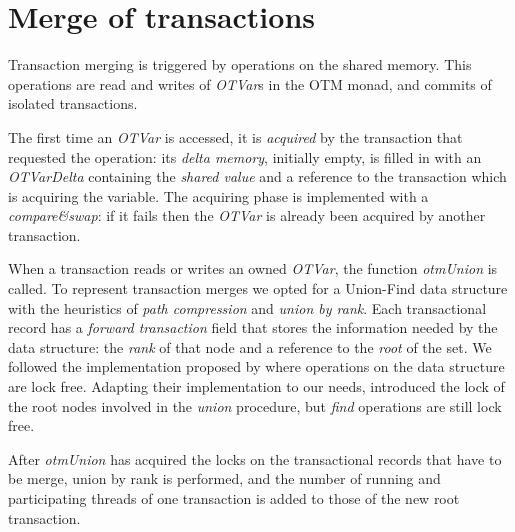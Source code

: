 \section{Merge of transactions}

Transaction merging is triggered by operations on the shared memory.
This operations are read and writes of \emph{OTVar}s in the OTM monad, and commits of isolated transactions.

The first time an \emph{OTVar} is accessed, it is \emph{acquired} by the transaction that requested the operation: its \emph{delta memory}, initially empty, is filled in with an \emph{OTVarDelta} containing the \emph{shared value} and a reference to the transaction which is acquiring the variable.
The acquiring phase is implemented with a \emph{compare\&swap}: if it fails then the \emph{OTVar} is already been acquired by another transaction.

When a transaction reads or writes an owned \emph{OTVar}, the function \emph{otmUnion} is called.
To represent transaction merges we opted for a Union-Find data structure with the heuristics of \emph{path compression} and \emph{union by rank}.
Each transactional record has a \emph{forward transaction} field that stores the information needed by the data structure: the \emph{rank} of that node and a reference to the \emph{root} of the set.
We followed the implementation proposed by \citet{Anderson94wait-freeparallel} where operations on the data structure are lock free.
Adapting their implementation to our needs, introduced the lock of the root nodes involved in the \emph{union} procedure, but \emph{find} operations are still lock free.

After \emph{otmUnion} has acquired the locks on the transactional records that have to be merge, union by rank is performed, and the number of running and participating threads of one transaction is added to those of the new root transaction.

